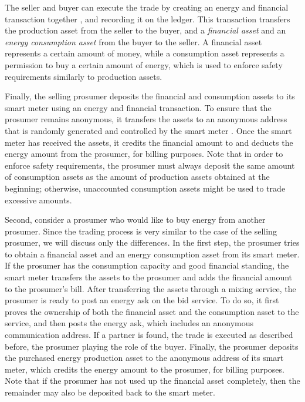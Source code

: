 The seller and buyer can execute the trade by creating an energy and financial transaction together , and recording it on the ledger.
This transaction transfers the production asset from the seller to the buyer, and a \emph{financial asset} and an \emph{energy consumption asset} from the buyer to the seller.
A financial asset represents a certain amount of money, while a consumption asset represents a permission to buy a certain amount of energy, which is used to enforce safety requirements similarly to production assets.

Finally, the selling prosumer deposits the financial and consumption assets to its smart meter using an energy and financial transaction.
To ensure that the prosumer remains anonymous, it transfers the assets to an anonymous address that is randomly generated and controlled by the smart meter .
Once the smart meter has received the assets, it credits the financial amount to and deducts the energy amount from the prosumer, for billing purposes.
Note that in order to enforce safety requirements, the prosumer must always deposit the same amount of consumption assets as the amount of production assets obtained at the beginning; otherwise, unaccounted consumption assets might be used to trade excessive amounts.

Second, consider a prosumer who would like to buy energy from another prosumer.
Since the trading process is very similar to the case of the selling prosumer, we will discuss only the differences.
In the first step, the prosumer tries to obtain a financial asset and an energy consumption asset from its smart meter.
If the prosumer has the consumption capacity and good financial standing, the smart meter transfers the assets to the prosumer and adds the financial amount to the prosumer's bill.
After transferring the assets through a mixing service, the prosumer is ready to post an energy ask on the bid service.
To do so, it first proves the ownership of both the financial asset and the consumption asset to the service, and then posts the energy ask, which includes an anonymous communication address.
If a partner is found, the trade is executed as described before, the prosumer playing the role of the buyer.
Finally, the prosumer deposits the purchased energy production asset to the anonymous address of its smart meter,
which credits the energy amount to the prosumer, for billing purposes.
Note that if the prosumer has not used up the financial asset completely, then the remainder may also be deposited back to the smart meter.

